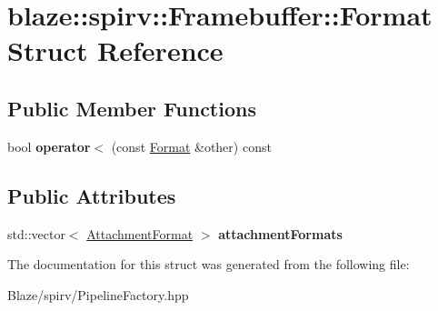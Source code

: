\hypertarget{structblaze_1_1spirv_1_1Framebuffer_1_1Format}{}\section{blaze\+:\+:spirv\+:\+:Framebuffer\+:\+:Format Struct Reference}
\label{structblaze_1_1spirv_1_1Framebuffer_1_1Format}
\subsection*{Public Member Functions}
\begin{DoxyCompactItemize}
\item 
\mbox{\label{structblaze_1_1spirv_1_1Framebuffer_1_1Format_a7179be170e4b1336623a9ce1dee1ed4a}} 
bool {\bfseries operator$<$} (const \hyperlink{structblaze_1_1spirv_1_1Framebuffer_1_1Format}{Format} \&other) const
\end{DoxyCompactItemize}
\subsection*{Public Attributes}
\begin{DoxyCompactItemize}
\item 
\mbox{\label{structblaze_1_1spirv_1_1Framebuffer_1_1Format_a6152082caafb384ed546fc9188d40c3d}} 
std\+::vector$<$ \hyperlink{structblaze_1_1spirv_1_1AttachmentFormat}{Attachment\+Format} $>$ {\bfseries attachment\+Formats}
\end{DoxyCompactItemize}


The documentation for this struct was generated from the following file\+:\begin{DoxyCompactItemize}
\item 
Blaze/spirv/Pipeline\+Factory.\+hpp\end{DoxyCompactItemize}
